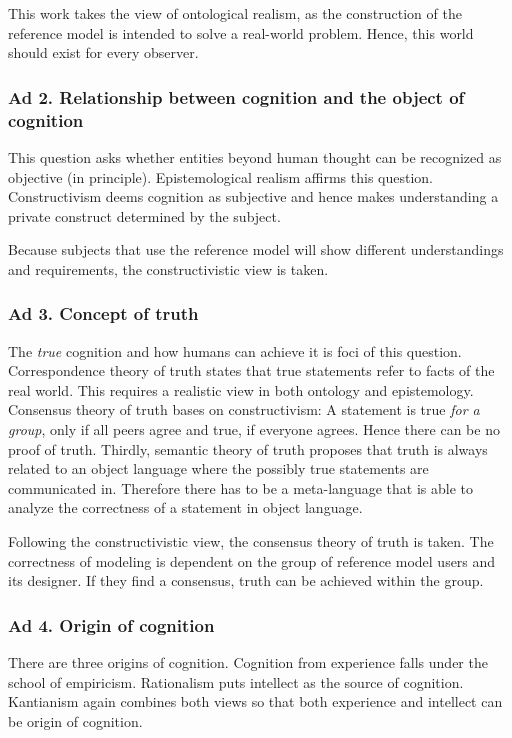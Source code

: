 This work takes the view of ontological realism, as the construction of the reference model is intended to solve a real-world problem. Hence, this world should exist for every observer. 

\subsubsection{Ad 2. Relationship between cognition and the object of cognition}
This question asks whether entities beyond human thought can be recognized as objective (in principle). Epistemological realism affirms this question. Constructivism deems cognition as subjective and hence makes understanding a private construct determined by the subject. 

Because subjects that use the reference model will show different understandings and requirements, the constructivistic view is taken. 

\subsubsection{Ad 3. Concept of truth}
The \textit{true} cognition and how humans can achieve it is foci of this question. Correspondence theory of truth states that true statements refer to facts of the real world. This requires a realistic view in both ontology and epistemology. Consensus theory of truth bases on constructivism: A statement is true\textit{ for a group}, only if all peers agree and true, if everyone agrees. Hence there can be no proof of truth. Thirdly, semantic theory of truth proposes that truth is always related to an object language where the possibly true statements are communicated in. Therefore there has to be a meta-language that is able to analyze the correctness of a statement in object language. 

Following the constructivistic view, the consensus theory of truth is taken. The correctness of modeling is dependent on the group of reference model users and its designer. If they find a consensus, truth can be achieved within the group. 

\subsubsection{Ad 4. Origin of cognition}
There are three origins of cognition. Cognition from experience falls under the school of empiricism. Rationalism puts intellect as the source of cognition. Kantianism again combines both views so that both experience and intellect can be origin of cognition. 

